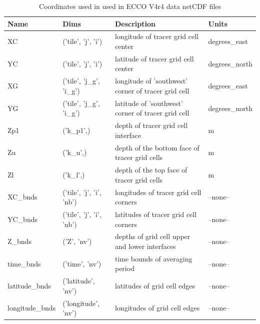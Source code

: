 \begin{longtable}{|p{}|p{}|p{}|p{}|}
\caption{Coordinates used in used in ECCO V4r4 data netCDF files}
\label{tab:variable-attributes} \\ 
\hline \endfirsthead
\endhead
\endfoot
\hline \endlastfoot
\rowcolor{blue!25} \textbf{Name} & \textbf{Dims} & \textbf{Description} & \textbf{Units} \\ \hline
\rowcolor{magenta!25}
XC & ('tile', 'j', 'i') & longitude of tracer grid cell center & degrees\_east \\ \hline
\rowcolor{magenta!25}
YC & ('tile', 'j', 'i') & latitude of tracer grid cell center & degrees\_north \\ \hline
\rowcolor{magenta!25}
XG & ('tile', 'j\_g', 'i\_g') & longitude of 'southwest' corner of tracer grid cell & degrees\_east \\ \hline
\rowcolor{magenta!25}
YG & ('tile', 'j\_g', 'i\_g') & latitude of 'southwest' corner of tracer grid cell & degrees\_north \\ \hline
\rowcolor{magenta!25}
Zp1 & ('k\_p1',) & depth of tracer grid cell interface & m \\ \hline
\rowcolor{magenta!25}
Zu & ('k\_u',) & depth of the bottom face of tracer grid cells & m \\ \hline
\rowcolor{magenta!25}
Zl & ('k\_l',) & depth of the top face of tracer grid cells & m \\ \hline
\rowcolor{magenta!25}
XC\_bnds & ('tile', 'j', 'i', 'nb') & longitudes of tracer grid cell corners & --none-- \\ \hline
\rowcolor{magenta!25}
YC\_bnds & ('tile', 'j', 'i', 'nb') & latitudes of tracer grid cell corners & --none-- \\ \hline
\rowcolor{magenta!25}
Z\_bnds & ('Z', 'nv') & depths of grid cell upper and lower interfaces & --none-- \\ \hline
\rowcolor{magenta!25}
time\_bnds & ('time', 'nv') & time bounds of averaging period & --none-- \\ \hline
\rowcolor{magenta!25}
latitude\_bnds & ('latitude', 'nv') & latitudes of grid cell edges & --none-- \\ \hline
\rowcolor{magenta!25}
longitude\_bnds & ('longitude', 'nv') & longitudes of grid cell edges & --none-- \\ \hline
\end{longtable}
